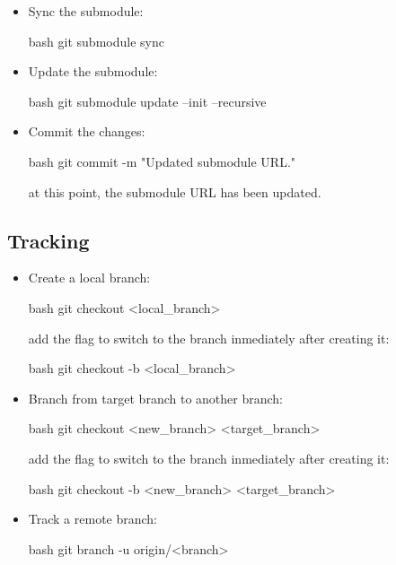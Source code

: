 \begin{itemize}
\begin{itemize}
        \item Sync the submodule:
        \begin{mintedbox}{bash}
git submodule sync
        \end{mintedbox}
        \item Update the submodule:
        \begin{mintedbox}{bash}
git submodule update --init --recursive
        \end{mintedbox}
        \item Commit the changes:
        \begin{mintedbox}{bash}
git commit -m "Updated submodule URL."
        \end{mintedbox}
        at this point, the submodule URL has been updated.
    \end{itemize}
\end{itemize}


\subsection{Tracking}

\begin{itemize}
    \item Create a local branch:
    \begin{mintedbox}{bash}
git checkout <local_branch>
    \end{mintedbox}
    add the  flag to switch to the branch inmediately after creating it:
    \begin{mintedbox}{bash}
git checkout -b <local_branch>
    \end{mintedbox}
    \item Branch from target branch to another branch:
    \begin{mintedbox}{bash}
git checkout <new_branch> <target_branch>
    \end{mintedbox}
    add the  flag to switch to the branch inmediately after creating it:
    \begin{mintedbox}{bash}
git checkout -b <new_branch> <target_branch>
    \end{mintedbox}
    \item Track a remote branch:
    \begin{mintedbox}{bash}
git branch -u origin/<branch>
    \end{mintedbox}
\end{itemize}
